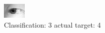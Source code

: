 \begin{figure}[h!]
\begin{center}
\includegraphics[width=0.60\columnwidth]{figures/ID1241_class_3_target_4.png}
\end{center}
\caption{ Classification: 3 actual target: 4}
\label{fig:ID1241_class_3_target_4}
\end{figure}
